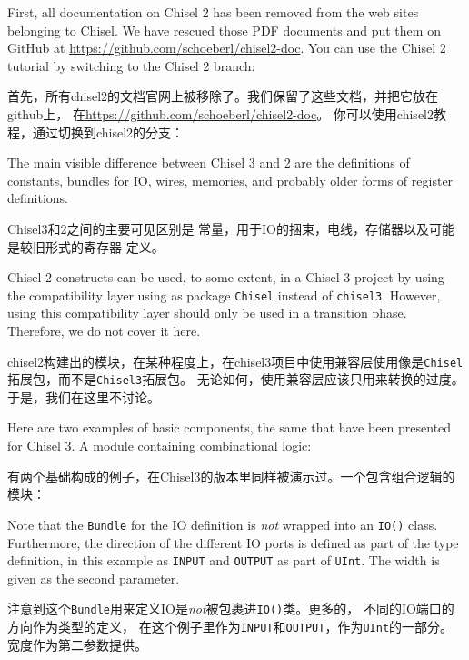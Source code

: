 \documentclass[%
    10pt,
    headinclude, footexclude,
    openright, %
    notitlepage,
    cleardoubleempty,
    headsepline,
    pointlessnumbers,
    bibtotoc, idxtotoc,
    ]{scrbook}
\newcommand{\code}[1]{{\small{\texttt{#1}}}}
\begin{document}
{First, all documentation on Chisel 2 has been removed from the web sites
belonging to Chisel. We have rescued those PDF documents and put them
on GitHub at \url{https://github.com/schoeberl/chisel2-doc}.
You can use the Chisel 2 tutorial by switching to the Chisel 2 branch:

首先，所有chisel2的文档官网上被移除了。我们保留了这些文档，并把它放在github上，
在\url{https://github.com/schoeberl/chisel2-doc}。
你可以使用chisel2教程，通过切换到chisel2的分支：


The main visible difference between Chisel 3 and 2 are the definitions of
constants, bundles for IO, wires, memories, and probably older forms of register
definitions.

Chisel3和2之间的主要可见区别是
常量，用于IO的捆束，电线，存储器以及可能是较旧形式的寄存器
定义。

Chisel 2 constructs can be used, to some extent, in a Chisel 3 project by
using the compatibility layer using as package \code{Chisel} instead of \code{chisel3}.
However, using this compatibility layer should only be used in a transition phase.
Therefore, we do not cover it here.

chisel2构建出的模块，在某种程度上，在chisel3项目中使用兼容层使用像是\code{Chisel}拓展包，而不是\code{Chisel3}拓展包。
无论如何，使用兼容层应该只用来转换的过度。于是，我们在这里不讨论。

Here are two examples of basic components, the same that have been presented
for Chisel 3. A module containing combinational logic:

有两个基础构成的例子，在Chisel3的版本里同样被演示过。一个包含组合逻辑的模块：


Note that the \code{Bundle} for the IO definition is \emph{not} wrapped into
an \code{IO()} class.  Furthermore, the direction of the different IO ports is defined
as part of the type definition, in this example as \code{INPUT} and \code{OUTPUT}
as part of \code{UInt}. The width is given as the second parameter.

注意到这个\code{Bundle}用来定义IO是\emph{not}被包裹进\code{IO()}类。更多的， 不同的IO端口的方向作为类型的定义，
在这个例子里作为\code{INPUT}和\code{OUTPUT}，作为\code{UInt}的一部分。宽度作为第二参数提供。

}
\end{document}
